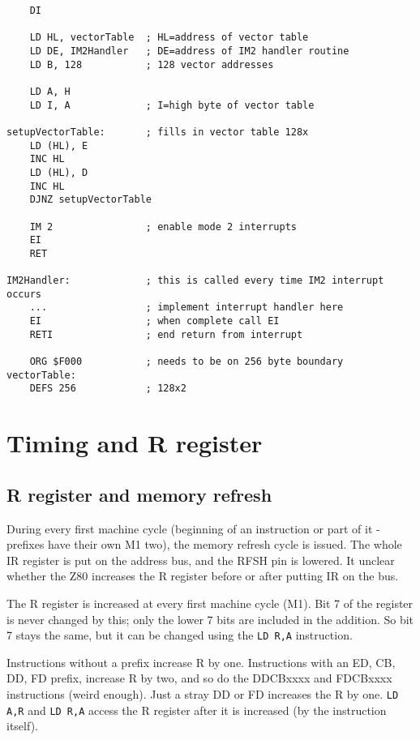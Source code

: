 \documentclass[12pt,twoside,openright,a4paper]{book}
\begin{document}
\begin{Verbatim}
	DI
	
	LD HL, vectorTable  ; HL=address of vector table
	LD DE, IM2Handler   ; DE=address of IM2 handler routine
	LD B, 128           ; 128 vector addresses

	LD A, H
	LD I, A             ; I=high byte of vector table

setupVectorTable:       ; fills in vector table 128x
	LD (HL), E
	INC HL
	LD (HL), D
	INC HL
	DJNZ setupVectorTable 

	IM 2                ; enable mode 2 interrupts
	EI
	RET

IM2Handler:             ; this is called every time IM2 interrupt occurs
	...                 ; implement interrupt handler here
	EI                  ; when complete call EI
	RETI                ; end return from interrupt

	ORG $F000           ; needs to be on 256 byte boundary
vectorTable:
	DEFS 256            ; 128x2
\end{Verbatim}

\pagebreak
\section{Timing and R register}

\subsection{R register and memory refresh}

During every first machine cycle (beginning of an instruction or part of it - prefixes have their own M1 two), the memory refresh cycle is issued. The whole IR register is put on the address bus, and the RFSH pin is lowered.  It unclear whether the Z80 increases the R register before or after putting IR on the bus. 

The R register is increased at every first machine cycle (M1). Bit 7 of the register is never changed by this; only the lower 7 bits are included in the addition. So bit 7 stays the same, but it can be changed using the
{\tt LD R,A} instruction.

Instructions without a prefix increase R by one. Instructions with an ED, CB, DD, FD prefix, increase R by two, and so do the DDCBxxxx and FDCBxxxx instructions (weird enough). Just a stray DD or FD increases the R by one. {\tt LD A,R} and {\tt LD R,A} access the R register after it is increased (by the instruction itself). 
\end{document}
